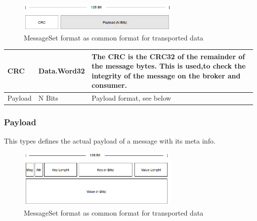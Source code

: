 \begin{figure}[H]
    \centering
    \includegraphics[width=0.7\textwidth]{images/impl-prot-types-message.png}
    \caption{MessageSet format as common format for transported data}
    \label{fig:impl-prot-types-message}
\end{figure}

\begin{table}[H]
\centering
\begin{tabular}{ l  l  p{11cm} }
\hline
CRC     & Data.Word32 & The CRC is the CRC32 of the remainder of the message bytes. This is used,to check the integrity of the message on the broker and consumer. \\ \hline
Payload & N Bits      & Payload format, see below                                                                                                                  \\ \hline
\end{tabular}
\end{table}

\subsubsection{Payload}
This types defines the actual payload of a message with its meta info.

\begin{figure}[H]
    \centering
    \includegraphics[width=0.7\textwidth]{images/impl-prot-types-payload.png}
    \caption{MessageSet format as common format for transported data}
    \label{fig:impl-prot-types-payload}
\end{figure}

